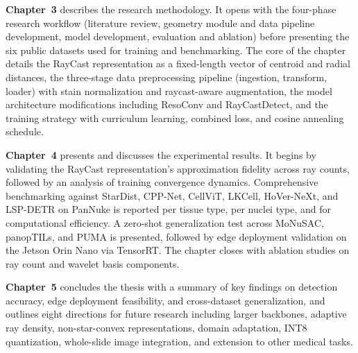 \textbf{Chapter~3} describes the research methodology. It opens with the four-phase research workflow (literature review, geometry module and data pipeline development, model development, evaluation and ablation) before presenting the six public datasets used for training and benchmarking. The core of the chapter details the RayCast representation as a fixed-length vector of centroid and radial distances, the three-stage data preprocessing pipeline (ingestion, transform, loader) with stain normalization and raycast-aware augmentation, the model architecture modifications including ResoConv and RayCastDetect, and the training strategy with curriculum learning, combined loss, and cosine annealing schedule.

\textbf{Chapter~4} presents and discusses the experimental results. It begins by validating the RayCast representation's approximation fidelity across ray counts, followed by an analysis of training convergence dynamics. Comprehensive benchmarking against StarDist, CPP-Net, CellViT, LKCell, HoVer-NeXt, and LSP-DETR on PanNuke is reported per tissue type, per nuclei type, and for computational efficiency. A zero-shot generalization test across MoNuSAC, panopTILs, and PUMA is presented, followed by edge deployment validation on the Jetson Orin Nano via TensorRT. The chapter closes with ablation studies on ray count and wavelet basis components.

\textbf{Chapter~5} concludes the thesis with a summary of key findings on detection accuracy, edge deployment feasibility, and cross-dataset generalization, and outlines eight directions for future research including larger backbones, adaptive ray density, non-star-convex representations, domain adaptation, INT8 quantization, whole-slide image integration, and extension to other medical tasks.
